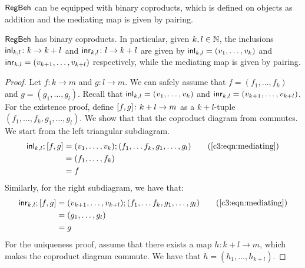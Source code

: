  $\mathsf{RegBeh}$ can be equipped with binary coproducts, which is defined on objects as addition and the mediating map is given by pairing.
\begin{lemma}
	$\mathsf{RegBeh}$ has binary coproducts. In particular, given $k, l \in \mathbb{N}$, the inclusions $\mathsf{inl}_{k,l} \colon k \to k +l$ and $\mathsf{inr}_{k,l} \colon l \to k + l$ are given by $\mathsf{inl}_{k,l} = (v_1, \dots, v_k)$ and $\mathsf{inr}_{k,l} = (v_{k+1}, \dots, v_{k+l})$ respectively, while the mediating map is given by pairing. 
\end{lemma}
\begin{proof}
	Let $f \colon k \to m$ and $g \colon l \to m$. We can safely assume that $f = (f_1, \dots, f_k)$ and $g = (g_1, \dots, g_l)$. Recall that $\mathsf{inl}_{k,l} = (v_1, \dots, v_k)$ and $\mathsf{inr}_{k,l} = (v_{k+1}, \dots, v_{k+l})$. For the existence proof, define $[ f , g ] \colon k + l \to m$ as a $k + l$-tuple $(f_1, \dots, f_k, g_1, \dots, g_l)$. We show that that the coproduct diagram from  commutes. We start from the left triangular subdiagram.
	\begin{align*}
		\inl_{k,l} ; \lc f , g\rc &= (v_1, \dots, v_k) ; (f_1, \dots f_k, g_1, \dots, g_l) \tag{\Cref{c3:eqn:mediating}}\\
		&= (f_1, \dots, f_k) \\
		&= f
	\end{align*}
	Similarly, for the right subdiagram, we have that:
	\begin{align*}
		\inr_{k,l} ; \lc f , g\rc &= (v_{k +1}, \dots, v_{k + l}) ; (f_1, \dots f_k, g_1, \dots, g_l) \tag{\Cref{c3:eqn:mediating}} \\
		&= (g_1, \dots, g_l) \\
		&= g
	\end{align*}
	For the uniqueness proof, assume that there exists a map $h \colon k + l \to m$, which makes the coproduct diagram commute. We have that $h = (h_1, \dots, h_{k + l})$. 

\end{proof}
